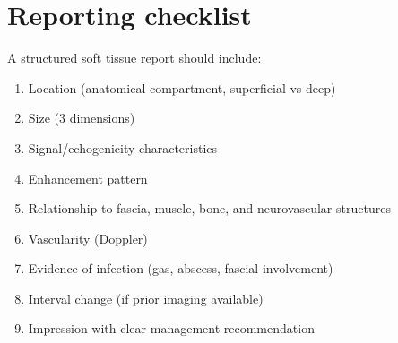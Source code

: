 \section{Reporting checklist}
A structured soft tissue report should include:
\begin{enumerate}
    \item Location (anatomical compartment, superficial vs deep)
    \item Size (3 dimensions)
    \item Signal/echogenicity characteristics
    \item Enhancement pattern
    \item Relationship to fascia, muscle, bone, and neurovascular structures
    \item Vascularity (Doppler)
    \item Evidence of infection (gas, abscess, fascial involvement)
    \item Interval change (if prior imaging available)
    \item Impression with clear management recommendation
\end{enumerate}

\clearpage

